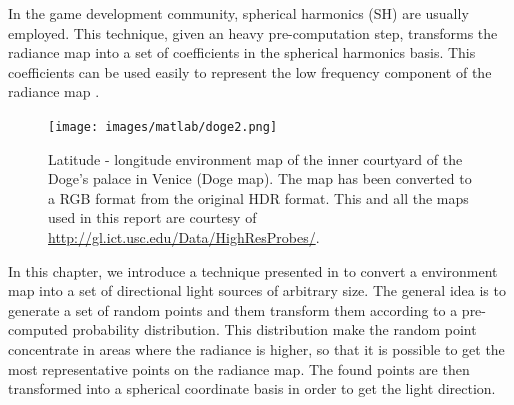 In the game development community, spherical harmonics (SH) \citep{green,peterpikeconference} are usually employed. This technique, given an heavy pre-computation step, transforms the radiance map into a set of coefficients in the spherical harmonics basis. This coefficients can be used easily to represent the low frequency component of the radiance map \cite{Ramamoorthi:2001:ERI:383259.383317}. 

\begin{figure}[!ht]
\centering
\texttt{[image: images/matlab/doge2.png]}
\caption{Latitude - longitude environment map of the inner courtyard of the Doge's palace in Venice (Doge map). The map has been converted to a RGB format from the original HDR format. This and all the maps used in this report are courtesy of \url{http://gl.ict.usc.edu/Data/HighResProbes/}.}
\label{fig:doge}
\end{figure}

In this chapter, we introduce a technique presented in \cite{Pharr:2004:PBR:975275} to convert a environment map into a set of directional light sources of arbitrary size. The general idea is to generate a set of random points and them transform them according to a pre-computed probability distribution. This distribution make the random point concentrate in areas where the radiance is higher, so that it is possible to get the most representative points on the radiance map. The found points are then transformed into a spherical coordinate basis in order to get the light direction.


